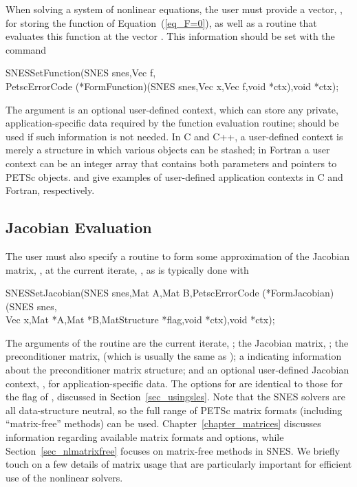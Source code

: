 When solving a system of nonlinear equations, the user must provide
a vector, , for storing the function of
Equation~(\ref{eq_F=0}), as well as a routine that evaluates this
function at the vector .  This information should be set with
the command 
\begin{tabbing}
  SNESSetFunction(SNES snes,Vec f,\\
          PetscErrorCode (*FormFunction)(SNES snes,Vec x,Vec f,void *ctx),void *ctx);
\end{tabbing}
The argument  is an optional user-defined context, which can
store any private, application-specific data required by the
function evaluation routine;  should be used if such information
is not needed.  In C and C++, a user-defined context is merely a
structure in which various objects can be stashed; in Fortran a user
context can be an integer array that contains both parameters and
pointers to PETSc objects.  and
 give examples of user-defined
application contexts in C and Fortran, respectively.

\subsection{Jacobian Evaluation}
\label{sec_snesjacobian}

The user must also specify a routine to form some approximation of the
Jacobian matrix, , at the current iterate, ,
as is typically done with
\begin{tabbing}
  SNESSetJacobian(SNES snes,Mat A,Mat B,PetscErrorCode (*FormJacobian)(SNES snes,\\
          Vec x,Mat *A,Mat *B,MatStructure *flag,void *ctx),void *ctx);
\end{tabbing}
The  arguments of the routine  are the current iterate, ; the Jacobian matrix,
; the preconditioner matrix,  (which is usually the same
as ); a  indicating information about the
preconditioner matrix structure; and an optional user-defined Jacobian
context, , for application-specific data.  The options for
 are identical to those for the flag of , discussed in Section~\ref{sec_usingsles}.  
Note that the SNES solvers are all data-structure neutral, so the full
range of PETSc matrix formats (including ``matrix-free''
methods) can be used.  Chapter~\ref{chapter_matrices} discusses
information regarding available matrix formats and options, while
Section~\ref{sec_nlmatrixfree} focuses on matrix-free
methods in SNES. We briefly touch on a few details of matrix usage that are
particularly important for efficient use of the nonlinear solvers.

